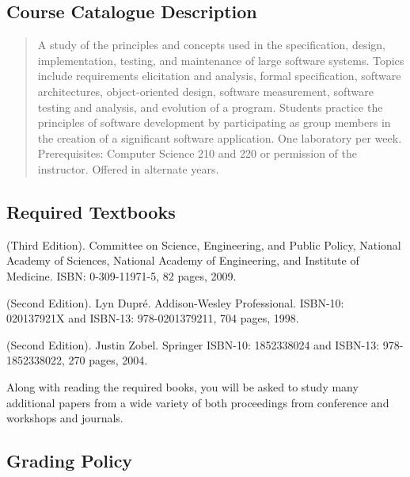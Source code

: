 \subsection*{Course Catalogue Description}

\begin{quote}
A study of the principles and concepts used in the specification, design, implementation, testing, and maintenance of
large software systems. Topics include requirements elicitation and analysis, formal specification, software
architectures, object-oriented design, software measurement, software testing and analysis, and evolution of a program.
Students practice the principles of software development by participating as group members in the creation of a
significant software application. One laboratory per week. Prerequisites: Computer Science 210 and 220 or permission of
the instructor. Offered in alternate years.
\end{quote}

\subsection*{Required Textbooks}

 (Third
Edition).  Committee on Science, Engineering, and Public Policy, National 
Academy of Sciences, National Academy of Engineering, and Institute 
of Medicine. ISBN: 0-309-11971-5, 82 pages, 2009.

(Second Edition). Lyn Dupr\'e.  Addison-Wesley Professional.
ISBN-10: 020137921X and ISBN-13: 978-0201379211, 704 pages, 1998.

 (Second Edition).
Justin Zobel.  Springer
ISBN-10: 1852338024 and ISBN-13: 978-1852338022, 270 pages, 2004.

Along with reading the required books, you will be asked to study many
additional papers from a wide variety of both proceedings from
conference and workshops and journals.

\subsection*{Grading Policy}

